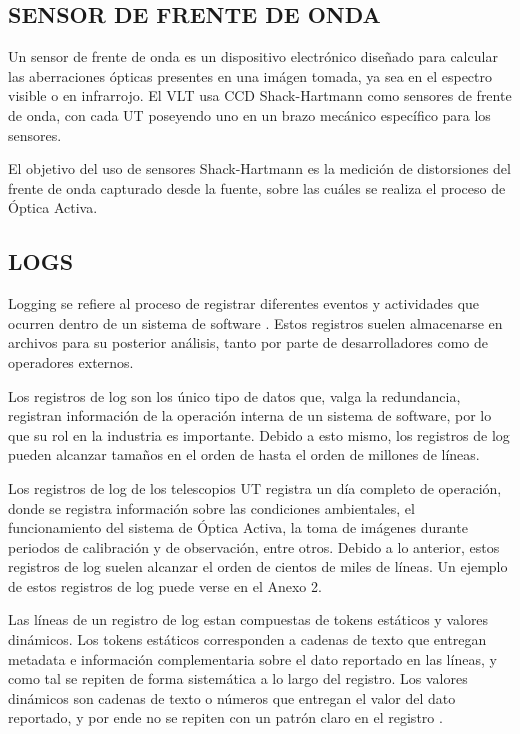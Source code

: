 \subsection{SENSOR DE FRENTE DE ONDA}
Un sensor de frente de onda es un dispositivo electrónico diseñado para calcular las aberraciones ópticas presentes en una imágen tomada, ya sea en el espectro visible o en infrarrojo. El VLT usa CCD Shack-Hartmann como sensores de frente de onda, con cada UT poseyendo uno en un brazo mecánico específico para los sensores.\cite{eso1998vlt}

El objetivo del uso de sensores Shack-Hartmann es la medición de distorsiones del frente de onda capturado desde la fuente, sobre las cuáles se realiza el proceso de Óptica Activa.\cite{eso1998vlt}

\subsection{LOGS}
Logging se refiere al proceso de registrar diferentes eventos y actividades que ocurren dentro de un sistema de software \cite{jayathilake2011mind}. Estos registros suelen almacenarse en archivos para su posterior análisis, tanto por parte de desarrolladores como de operadores externos.

Los registros de log son los único tipo de datos que, valga la redundancia, registran información de la operación interna de un sistema de software, por lo que su rol en la industria es importante. Debido a esto mismo, los registros de log pueden alcanzar tamaños en el orden de hasta el orden de millones de líneas\cite{ma2023automatic}.

Los registros de log de los telescopios UT registra un día completo de operación, donde se registra información sobre las condiciones ambientales, el funcionamiento del sistema de Óptica Activa, la toma de imágenes durante periodos de calibración y de observación, entre otros. Debido a lo anterior, estos registros de log suelen alcanzar el orden de cientos de miles de líneas. Un ejemplo de estos registros de log puede verse en el Anexo 2.

Las líneas de un registro de log estan compuestas de tokens estáticos y valores dinámicos. Los tokens estáticos corresponden a cadenas de texto que entregan metadata e información complementaria sobre el dato reportado en las líneas, y como tal se repiten de forma sistemática a lo largo del registro. Los valores dinámicos son cadenas de texto o números que entregan el valor del dato reportado, y por ende no se repiten con un patrón claro en el registro \cite{ma2023automatic}. 

